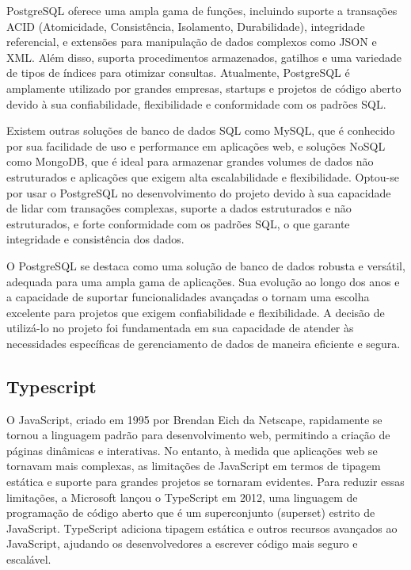 PostgreSQL oferece uma ampla gama de funções, incluindo suporte a transações ACID (Atomicidade, Consistência, Isolamento, Durabilidade), integridade referencial, e extensões para manipulação de dados complexos como JSON e XML. Além disso, suporta procedimentos armazenados, gatilhos e uma variedade de tipos de índices para otimizar consultas. Atualmente, PostgreSQL é amplamente utilizado por grandes empresas, startups e projetos de código aberto devido à sua confiabilidade, flexibilidade e conformidade com os padrões SQL.

Existem outras soluções de banco de dados SQL como MySQL, que é conhecido por sua facilidade de uso e performance em aplicações web, e soluções NoSQL como MongoDB, que é ideal para armazenar grandes volumes de dados não estruturados e aplicações que exigem alta escalabilidade e flexibilidade. Optou-se por usar o PostgreSQL no desenvolvimento do projeto devido à sua capacidade de lidar com transações complexas, suporte a dados estruturados e não estruturados, e forte conformidade com os padrões SQL, o que garante integridade e consistência dos dados.

O PostgreSQL se destaca como uma solução de banco de dados robusta e versátil, adequada para uma ampla gama de aplicações. Sua evolução ao longo dos anos e a capacidade de suportar funcionalidades avançadas o tornam uma escolha excelente para projetos que exigem confiabilidade e flexibilidade. A decisão de utilizá-lo no projeto foi fundamentada em sua capacidade de atender às necessidades específicas de gerenciamento de dados de maneira eficiente e segura.

\subsection{Typescript}

O JavaScript, criado em 1995 por Brendan Eich da Netscape, rapidamente se tornou a linguagem padrão para desenvolvimento web, permitindo a criação de páginas dinâmicas e interativas. No entanto, à medida que aplicações web se tornavam mais complexas, as limitações de JavaScript em termos de tipagem estática e suporte para grandes projetos se tornaram evidentes. Para reduzir essas limitações, a Microsoft lançou o TypeScript em 2012, uma linguagem de programação de código aberto que é um superconjunto (superset) estrito de JavaScript. TypeScript adiciona tipagem estática e outros recursos avançados ao JavaScript, ajudando os desenvolvedores a escrever código mais seguro e escalável.

